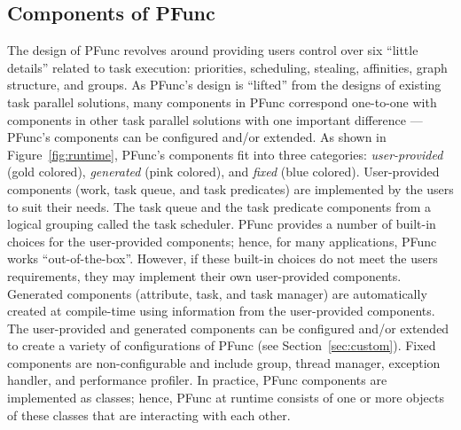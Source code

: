 \subsection{Components of PFunc}
\label{subsec:pfunc_components}

The design of PFunc revolves around providing users control over six ``little
details'' related to task execution: priorities, scheduling, stealing,
affinities, graph structure, and groups.
%
As PFunc's design is ``lifted'' from the designs of existing task parallel
solutions, many components in PFunc correspond one-to-one with components in
other task parallel solutions with one important difference --- PFunc's
components can be configured and/or extended.
%
As shown in Figure~\ref{fig:runtime}, PFunc's components fit into three
categories: \textit{user-provided} (gold colored), \textit{generated} (pink
colored), and \textit{fixed} (blue colored).
%
User-provided components (work, task queue, and task predicates) are
implemented by the users to suit their needs.  
%
The task queue and the task predicate components from a logical grouping called
the task scheduler.
%
PFunc provides a number of built-in choices for the user-provided components;
hence, for many applications, PFunc works ``out-of-the-box''. 
%
However, if these built-in choices do not meet the users requirements, they may 
implement their own user-provided components.
%
Generated components (attribute, task, and task manager) are automatically
created at compile-time using information from the user-provided components.
%
The user-provided and generated components can be configured and/or extended to
create a variety of configurations of PFunc (see Section~\ref{sec:custom}).
%
Fixed components are non-configurable and include group, thread manager,
exception handler, and performance profiler.
%
In practice, PFunc components are implemented as \Cpp{} classes; hence, PFunc
at runtime consists of one or more objects of these classes that are
interacting with each other.
%

